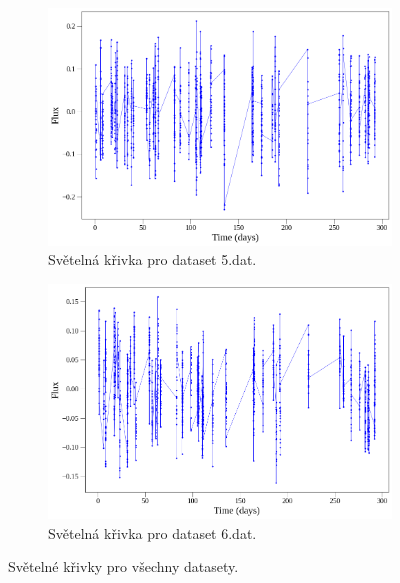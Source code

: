 \documentclass[a4paper,11pt,twocolumn]{article}
\begin{document}
\begin{figure}
\begin{subfigure}[t]{0.48\textwidth}
                    \includegraphics[width=\textwidth]{5_ls.png}
                    \caption{Světelná křivka pro dataset 5.dat.}
                    \label{fig:5_ls}
                \end{subfigure}
                \hfill
                \begin{subfigure}[t]{0.48\textwidth}
                    \centering
                    \includegraphics[width=\textwidth]{6_ls.png}
                    \caption{Světelná křivka pro dataset 6.dat.}
                    \label{fig:6_ls}
                \end{subfigure}
                \caption{Světelné křivky pro všechny datasety.}
                \label{fig:all_lc}
            \end{figure}
\end{document}
